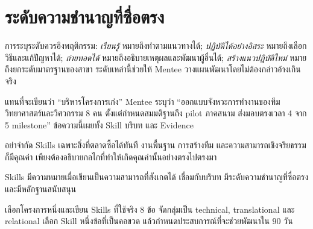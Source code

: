 \section{ระดับความชำนาญที่ซื่อตรง}
การระบุระดับควรอิงพฤติกรรม: \textit{เรียนรู้} หมายถึงทำตามแนวทางได้; \textit{ปฏิบัติได้อย่างอิสระ} หมายถึงเลือกวิธีและแก้ปัญหาได้; \textit{ถ่ายทอดได้} หมายถึงอธิบายเหตุผลและพัฒนาผู้อื่นได้; \textit{สร้างแนวปฏิบัติใหม่} หมายถึงยกระดับมาตรฐานของสาขา ระดับเหล่านี้ช่วยให้ Mentee วางแผนพัฒนาโดยไม่ต้องกล่าวอ้างเกินจริง

\begin{examplebox}
แทนที่จะเขียนว่า \enquote{บริหารโครงการเก่ง} Mentee ระบุว่า \enquote{ออกแบบจังหวะการทำงานของทีมวิทยาศาสตร์และวิศวกรรม 8 คน ตั้งแต่กำหนดสมมติฐานถึง pilot ภาคสนาม ส่งมอบตรงเวลา 4 จาก 5 milestone} ข้อความนี้เผยทั้ง Skill บริบท และ Evidence
\end{examplebox}


\begin{mentornote}
อย่าจำกัด Skills เฉพาะสิ่งที่ตลาดซื้อได้ทันที งานพื้นฐาน การสร้างทีม และความสามารถเชิงจริยธรรมก็มีคุณค่า เพียงต้องอธิบายกลไกที่ทำให้เกิดคุณค่านั้นอย่างตรงไปตรงมา
\end{mentornote}

\begin{keytakeaway}
Skills มีความหมายเมื่อเขียนเป็นความสามารถที่สังเกตได้ เชื่อมกับบริบท มีระดับความชำนาญที่ซื่อตรง และมีหลักฐานสนับสนุน
\end{keytakeaway}

\begin{reflection}
เลือกโครงการหนึ่งและเขียน Skills ที่ใช้จริง 8 ข้อ จัดกลุ่มเป็น technical, translational และ relational เลือก Skill หนึ่งข้อที่เป็นคอขวด แล้วกำหนดประสบการณ์ที่จะช่วยพัฒนาใน 90 วัน
\blankline\blankline
\end{reflection}


